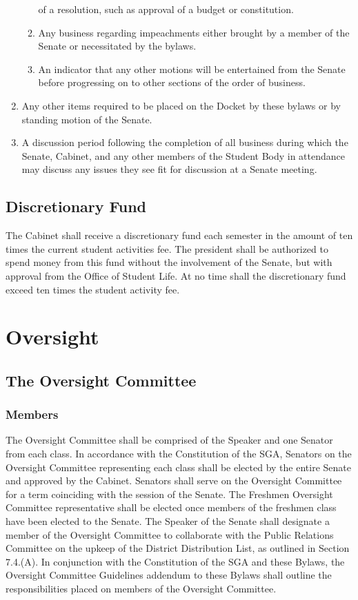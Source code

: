 \documentclass[12pt]{scrreprt}
\begin{document}
\begin{enumerate}
\begin{enumerate}
                  of a resolution, such as approval of a budget or 
                  constitution. 
            \item Any business regarding impeachments either brought by a 
                  member of the Senate or necessitated by the bylaws. 
            \item An indicator that any other motions will be entertained from 
                  the Senate before progressing on to other sections of the 
                  order of business. 
        \end{enumerate}
    \item Any other items required to be placed on the Docket by these bylaws 
          or by standing motion of the Senate.
    \item A discussion period following the completion of all business during which the Senate, Cabinet, and any other members of the Student Body in attendance may discuss any issues they see fit for discussion at a Senate meeting.
\end{enumerate}

\section{Discretionary Fund}
The Cabinet shall receive a discretionary fund each semester in the amount of 
ten times the current student activities fee. The president shall be 
authorized to spend money from this fund without the involvement of the 
Senate, but with approval from the Office of Student Life. At no time shall 
the discretionary fund exceed ten times the student activity fee. 

\chapter{Oversight}

\section{The Oversight Committee}

\subsection{Members} \label{sec:oversight_membership}
The Oversight Committee shall be comprised of the Speaker and one Senator from 
each class. In accordance with the Constitution of the SGA, Senators on the Oversight Committee representing each class shall be elected by the entire Senate and approved by the Cabinet. Senators shall serve on the Oversight Committee for a term coinciding with the session of the 
Senate. The Freshmen Oversight Committee representative shall be elected once members of the freshmen class have been elected to the Senate. The Speaker of the Senate shall designate a member of the Oversight Committee to collaborate with the Public Relations Committee on the upkeep of the District Distribution List, as outlined in Section 7.4.(A). In conjunction with the Constitution of the SGA and these Bylaws, the Oversight Committee Guidelines addendum to these Bylaws shall outline the responsibilities placed on members of the Oversight Committee.
\end{document}
